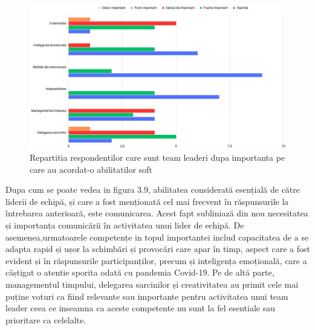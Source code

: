 \documentclass[a4paper, 12pt]{article}
\begin{document}
	\begin{figure}[!htb]
			\centering
			\includegraphics[width=17cm, height=12 cm]{"figures/team leaders (2).png"}
			\caption {Repartitia respondentilor care sunt team leaderi dupa importanta pe care au acordat-o abilitatilor soft}\label{fig:four}
			
		\end{figure}

	\quad Dupa cum se poate vedea in figura 3.9, abilitatea considerată esențială de către liderii de echipă, și care a fost menționată cel mai frecvent în răspunsurile la întrebarea anterioară, este comunicarea. Acest fapt subliniază din nou necesitatea și importanța comunicării în activitatea unui lider de echipă. De asemenea,urmatoarele competențe in topul importantei includ capacitatea de a se adapta rapid și ușor la schimbări și provocări care apar în timp, aspect care a fost evident și în răspunsurile participanților, precum și inteligența emoțională, care a câștigat o atentie sporita odată cu pandemia Covid-19. Pe de altă parte, managementul timpului, delegarea sarcinilor și creativitatea au primit cele mai puține voturi ca fiind relevante sau importante pentru activitatea unui team leader ceea ce inseamna ca aceste competente nu sunt la fel esentiale sau prioritare ca celelalte.

	\newpage 
\end{document}
